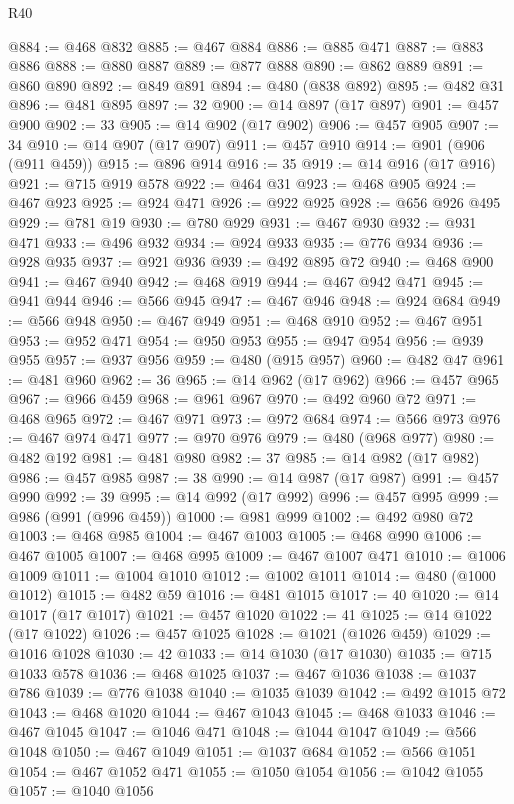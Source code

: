 \begin{lexlean}{R40}
\begin{coremodule}
@884 := @468 @832
@885 := @467 @884
@886 := @885 @471
@887 := @883 @886
@888 := @880 @887
@889 := @877 @888
@890 := @862 @889
@891 := @860 @890
@892 := @849 @891
@894 := @480 (@838 @892)
@895 := @482 @31
@896 := @481 @895
@897 := 32
@900 := @14 @897 (@17 @897)
@901 := @457 @900
@902 := 33
@905 := @14 @902 (@17 @902)
@906 := @457 @905
@907 := 34
@910 := @14 @907 (@17 @907)
@911 := @457 @910
@914 := @901 (@906 (@911 @459))
@915 := @896 @914
@916 := 35
@919 := @14 @916 (@17 @916)
@921 := @715 @919 @578
@922 := @464 @31
@923 := @468 @905
@924 := @467 @923
@925 := @924 @471
@926 := @922 @925
@928 := @656 @926 @495
@929 := @781 @19
@930 := @780 @929
@931 := @467 @930
@932 := @931 @471
@933 := @496 @932
@934 := @924 @933
@935 := @776 @934
@936 := @928 @935
@937 := @921 @936
@939 := @492 @895 @72
@940 := @468 @900
@941 := @467 @940
@942 := @468 @919
@944 := @467 @942 @471
@945 := @941 @944
@946 := @566 @945
@947 := @467 @946
@948 := @924 @684
@949 := @566 @948
@950 := @467 @949
@951 := @468 @910
@952 := @467 @951
@953 := @952 @471
@954 := @950 @953
@955 := @947 @954
@956 := @939 @955
@957 := @937 @956
@959 := @480 (@915 @957)
@960 := @482 @47
@961 := @481 @960
@962 := 36
@965 := @14 @962 (@17 @962)
@966 := @457 @965
@967 := @966 @459
@968 := @961 @967
@970 := @492 @960 @72
@971 := @468 @965
@972 := @467 @971
@973 := @972 @684
@974 := @566 @973
@976 := @467 @974 @471
@977 := @970 @976
@979 := @480 (@968 @977)
@980 := @482 @192
@981 := @481 @980
@982 := 37
@985 := @14 @982 (@17 @982)
@986 := @457 @985
@987 := 38
@990 := @14 @987 (@17 @987)
@991 := @457 @990
@992 := 39
@995 := @14 @992 (@17 @992)
@996 := @457 @995
@999 := @986 (@991 (@996 @459))
@1000 := @981 @999
@1002 := @492 @980 @72
@1003 := @468 @985
@1004 := @467 @1003
@1005 := @468 @990
@1006 := @467 @1005
@1007 := @468 @995
@1009 := @467 @1007 @471
@1010 := @1006 @1009
@1011 := @1004 @1010
@1012 := @1002 @1011
@1014 := @480 (@1000 @1012)
@1015 := @482 @59
@1016 := @481 @1015
@1017 := 40
@1020 := @14 @1017 (@17 @1017)
@1021 := @457 @1020
@1022 := 41
@1025 := @14 @1022 (@17 @1022)
@1026 := @457 @1025
@1028 := @1021 (@1026 @459)
@1029 := @1016 @1028
@1030 := 42
@1033 := @14 @1030 (@17 @1030)
@1035 := @715 @1033 @578
@1036 := @468 @1025
@1037 := @467 @1036
@1038 := @1037 @786
@1039 := @776 @1038
@1040 := @1035 @1039
@1042 := @492 @1015 @72
@1043 := @468 @1020
@1044 := @467 @1043
@1045 := @468 @1033
@1046 := @467 @1045
@1047 := @1046 @471
@1048 := @1044 @1047
@1049 := @566 @1048
@1050 := @467 @1049
@1051 := @1037 @684
@1052 := @566 @1051
@1054 := @467 @1052 @471
@1055 := @1050 @1054
@1056 := @1042 @1055
@1057 := @1040 @1056

\end{coremodule}
\end{lexlean}
